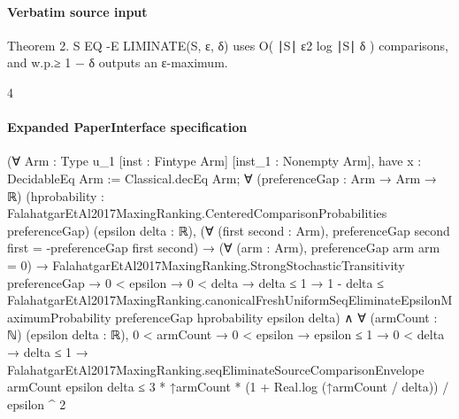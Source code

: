 \documentclass[10pt]{article}
\begin{document}
\paragraph{Verbatim source input}
\begin{ReviewVerbatim}
Theorem 2. S EQ -E LIMINATE(S, ε, δ) uses O( ∣S∣
                                             ε2
                                                 log ∣S∣
                                                      δ
                                                         ) comparisons, and w.p.≥ 1 − δ outputs an
ε-maximum.


                                                       4
\end{ReviewVerbatim}



\paragraph{Expanded PaperInterface specification}
\begin{ReviewVerbatim}
(∀ {Arm : Type u_1} [inst : Fintype Arm] [inst_1 : Nonempty Arm],
    have x : DecidableEq Arm := Classical.decEq Arm;
    ∀ (preferenceGap : Arm → Arm → ℝ)
      (hprobability : FalahatgarEtAl2017MaxingRanking.CenteredComparisonProbabilities preferenceGap)
      (epsilon delta : ℝ),
      (∀ (first second : Arm), preferenceGap second first = -preferenceGap first second) →
        (∀ (arm : Arm), preferenceGap arm arm = 0) →
          FalahatgarEtAl2017MaxingRanking.StrongStochasticTransitivity preferenceGap →
            0 < epsilon →
              0 < delta →
                delta ≤ 1 →
                  1 - delta ≤
                    FalahatgarEtAl2017MaxingRanking.canonicalFreshUniformSeqEliminateEpsilonMaximumProbability
                      preferenceGap hprobability epsilon delta) ∧
  ∀ (armCount : ℕ) (epsilon delta : ℝ),
    0 < armCount →
      0 < epsilon →
        epsilon ≤ 1 →
          0 < delta →
            delta ≤ 1 →
              FalahatgarEtAl2017MaxingRanking.seqEliminateSourceComparisonEnvelope armCount epsilon delta ≤
                3 * ↑armCount * (1 + Real.log (↑armCount / delta)) / epsilon ^ 2
\end{ReviewVerbatim}
\end{document}
